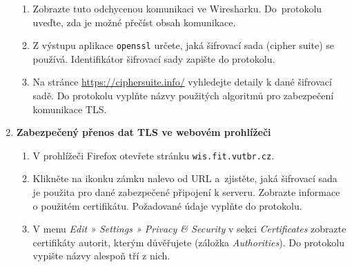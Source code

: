 \documentclass[a4paper,11pt]{article}
\begin{document}
\begin{enumerate}
\begin{enumerate}
      \item Zobrazte tuto odchycenou komunikaci ve Wiresharku.  Do~protokolu uveďte, zda je možné přečíst obsah komunikace. 

      \item Z výstupu aplikace \texttt{openssl} určete, jaká šifrovací sada (cipher suite) se používá. Identifikátor šifrovací sady zapište do protokolu.

      \item Na stránce \url{https://ciphersuite.info/} vyhledejte detaily k dané šifrovací sadě. Do protokolu vyplňte názvy použitých algoritmů pro zabezpečení komunikace TLS.
    \end{enumerate}

  \item {\bf Zabezpečený přenos dat TLS ve webovém prohlížeči}

    \begin{enumerate}
      \item V prohlížeči Firefox otevřete stránku  \verb|wis.fit.vutbr.cz|.
      \item Klikněte na ikonku zámku nalevo od URL a~zjistěte, jaká šifrovací sada je použita pro dané zabezpečené připojení k serveru. Zobrazte informace o použitém certifikátu.
      Požadované údaje vyplňte do protokolu.
      \item V menu \emph{Edit » Settings » Privacy \& Security} v sekci
        \emph{Certificates} zobrazte certifikáty autorit, kterým důvěřujete (záložka {\em Authorities}). Do protokolu vypište názvy alespoň tří z nich.
    \end{enumerate}

\end{enumerate}
\end{document}
